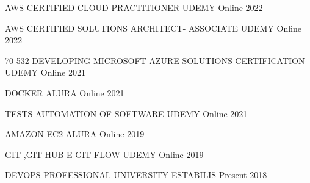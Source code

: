 

\begin{cvhonors}

  \cvhonor
    {AWS CERTIFIED CLOUD PRACTITIONER} %
    {UDEMY} %
    {Online} %
    {2022} %

  \cvhonor
    {AWS CERTIFIED SOLUTIONS ARCHITECT- ASSOCIATE} %
    {UDEMY} %
    {Online} %
    {2022} %

  \cvhonor
    {70-532 DEVELOPING MICROSOFT AZURE SOLUTIONS CERTIFICATION} %
    {UDEMY} %
    {Online} %
    {2021} %

  \cvhonor
    {DOCKER} %
    {ALURA} %
    {Online} %
    {2021} %

  \cvhonor
    {TESTS AUTOMATION OF SOFTWARE} %
    {UDEMY} %
    {Online} %
    {2021} %

  \cvhonor
    {AMAZON EC2} %
    {ALURA} %
    {Online} %
    {2019} %

  \cvhonor
    {GIT ,GIT HUB E GIT FLOW} %
    {UDEMY} %
    {Online} %
    {2019} %

  \cvhonor
    {DEVOPS PROFESSIONAL} %
    {UNIVERSITY ESTABILIS} %
    {Present} %
    {2018} %


\end{cvhonors}
